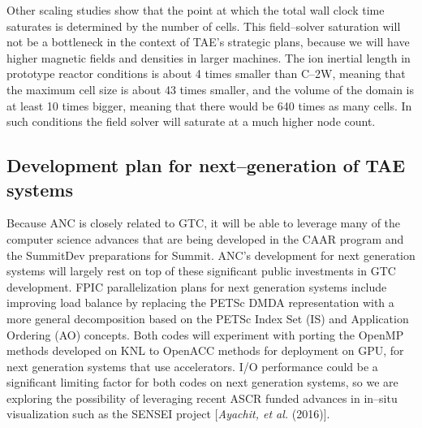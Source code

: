 \documentclass[a4paper,openany,12pt]{book}
\begin{document}
Other scaling studies show that the point at which the total wall clock time saturates is determined by the number of cells. This field--solver saturation will not be a bottleneck in the context of TAE's strategic plans, because we will have higher magnetic fields and densities in larger machines. The ion inertial length in prototype reactor conditions is about 4 times smaller than C--2W, meaning that the maximum cell size is about 43 times smaller, and the volume of the domain is at least 10 times bigger, meaning that there would be 640 times as many cells. In such conditions the field solver will saturate at a much higher node count.

\subsection{Development plan for next--generation of TAE systems}

Because ANC is closely related to GTC, it will be able to leverage many of the computer science advances that are being developed in the CAAR program and the SummitDev preparations for Summit. ANC's development for next generation systems will largely rest on top of these significant public investments in GTC development. FPIC parallelization plans for next generation systems include improving load balance by replacing the PETSc DMDA representation with a more general decomposition based on the PETSc Index Set (IS) and Application Ordering (AO) concepts. Both codes will experiment with porting the OpenMP methods developed on KNL to OpenACC methods for deployment on GPU, for next generation systems that use accelerators. I/O performance could be a significant limiting factor for both codes on next generation systems, so we are exploring the possibility of leveraging recent ASCR funded advances in in--situ visualization such as the SENSEI project [\emph{Ayachit, et al.} (2016)]. 
\end{document}
